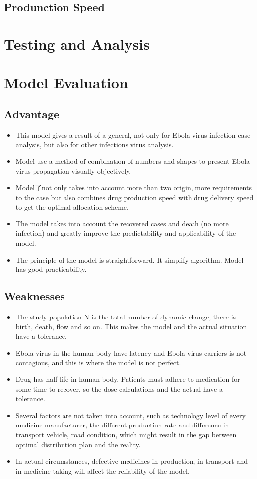 \documentclass{icmmcm}
\begin{document}
\subsection{Produnction Speed}

\section{Testing and Analysis}


\section{Model Evaluation}
\subsection{Advantage}
\begin{itemize}
  \item This model gives a result of a general, not only for
  Ebola virus infection case analysis, but also for other
  infections virus analysis.
  \item Model use a method of combination of numbers and shapes
  to present Ebola virus propagation visually objectively.
  \item Model了not only takes into account more than two origin,
  more requirements to the case  but also combines drug
  production speed with drug delivery speed to get the optimal
  allocation scheme.
  \item The model takes into account the recovered cases and
  death (no more infection) and greatly improve the
  predictability and applicability of the model.
  \item The principle of the model is straightforward. It
  simplify algorithm. Model has good practicability.
\end{itemize}
\subsection{Weaknesses}
\begin{itemize}
  \item The study population N is the total number of dynamic
  change, there is birth, death, flow and so on. This makes the
  model and the actual situation have a tolerance.
  \item Ebola virus in the human body have latency and Ebola
  virus carriers is not contagious, and this is where the model
  is not perfect.
  \item  Drug has half-life in human body. Patients must adhere
  to medication for some time to recover, so the dose
  calculations and the actual have a tolerance.
  \item Several factors are not taken into account, such as
  technology level of every medicine manufacturer, the
  different production rate and difference in transport
  vehicle, road condition, which might result in the gap
  between optimal distribution plan and the reality.
  \item In actual circumstances, defective medicines in
  production, in transport and in medicine-taking will affect
  the reliability of the model.
\end{itemize}
\end{document}
